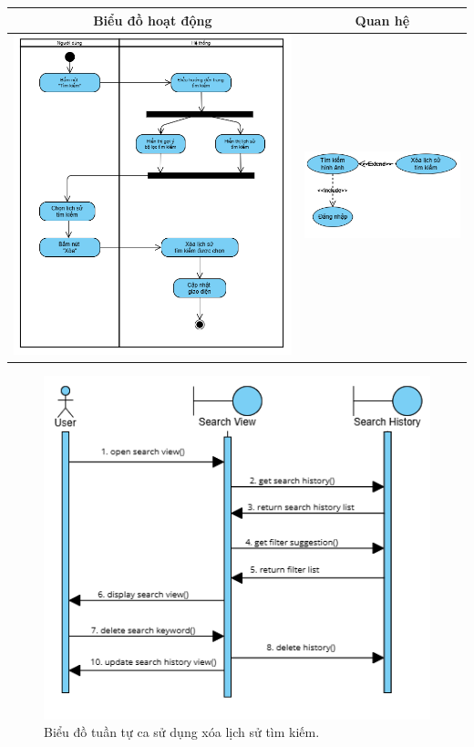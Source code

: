 \noindent 
\begin{tabular}{| c | c |}
    \hline
    \textbf{Biểu đồ hoạt động} & \textbf{Quan hệ} \\ 
    \hline
    \includegraphics[width=0.6\linewidth]{figures/c3/3-3-17-activity-diagram.png} 
    &  
    \includegraphics[width=0.35\linewidth]{figures/c3/3-3-17-relationship.png} \\ 
    \hline
\end{tabular}

\begin{figure}[H]
    \centering  
    \includegraphics[width=1\textwidth]{figures/c3/3-3-17-sequence-diagram.png}
    \caption{Biểu đồ tuần tự ca sử dụng xóa lịch sử tìm kiếm.}
    \label{fig:3-3-17-sequence-diagram}
\end{figure}
